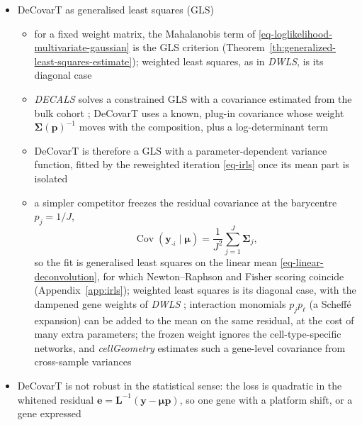 \begin{itemize}
  \item DeCovarT as generalised least squares (GLS)
  \begin{itemize}
    \item for a fixed weight matrix, the Mahalanobis term of
          \eqref{eq-loglikelihood-multivariate-gaussian} is the GLS criterion
          (Theorem~\ref{th:generalized-least-squares-estimate}); weighted least squares, as in \emph{DWLS}, is
          its diagonal case \cite{tsoucasAccurateEstimationCelltype2019}
    \item \emph{DECALS} solves a constrained GLS with a covariance estimated from the bulk cohort
          \cite{caiStatisticalInferenceCelltype2024}; DeCovarT uses a known, plug-in covariance whose weight
          \(\boldsymbol{\Sigma}(\boldsymbol{p})^{-1}\) moves with the composition, plus a log-determinant term
    \item DeCovarT is therefore a GLS with a parameter-dependent variance function, fitted by the reweighted
          iteration \eqref{eq-irls} once its mean part is isolated
    \item a simpler competitor freezes the residual covariance at the barycentre \(p_{j}=1/J\),\label{app:special}
          \begin{equation}
            \operatorname{Cov}(\boldsymbol{y}_{\cdot i}\mid\boldsymbol{\mu})=\frac{1}{J^{2}}\sum_{j=1}^{J}\boldsymbol{\Sigma}_{j},
            \label{eq-gls-barycentre}
          \end{equation}
          so the fit is generalised least squares on the linear mean \eqref{eq-linear-deconvolution}, for which
          Newton--Raphson and Fisher scoring coincide (Appendix~\ref{app:irls}); weighted least squares is its diagonal
          case, with the dampened gene weights of \emph{DWLS} \cite{tsoucasAccurateEstimationCelltype2019}; interaction
          monomials \(p_{j}p_{\ell}\) (a Scheff\'e expansion) can be added to the mean on the same residual, at the cost of
          many extra parameters; the frozen weight ignores the
          cell-type-specific networks, and \emph{cellGeometry} estimates such a gene-level covariance from cross-sample
          variances \cite{lauCellGeometryUltrafastSinglecell2026}
  \end{itemize}
  \item DeCovarT is not robust in the statistical sense: the loss is quadratic in the whitened residual
        \(\boldsymbol{e}=\boldsymbol{L}^{-1}(\boldsymbol{y}-\boldsymbol{\mu}\boldsymbol{p})\), so one gene with a platform shift, or a gene expressed

\end{itemize}
